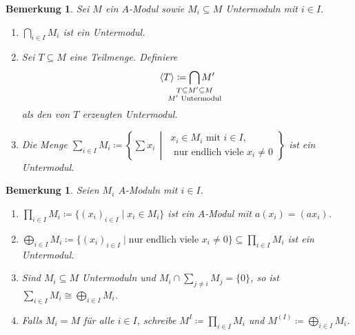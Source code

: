\documentclass[12pt,a4paper]{scrartcl}
\theoremstyle{cplain}
\theoremstyle{cdef}
\newtheorem{beme}[thmcounter]{Bemerkung}
\begin{document}
\begin{beme}
	Sei $M$ ein $A$-Modul sowie $M_i\subseteq M$ Untermoduln mit $i\in I$.
	\begin{enumerate}
		\item $\bigcap\limits_{i\in I} M_i$ ist ein Untermodul.
		\item Sei $T\subseteq M$ eine Teilmenge. Definiere
		\[\<T\> \coloneqq \bigcap_{\mathclap{\substack{T\subseteq M'\subseteq M\\\text{$M'$ Untermodul}}}} M'\] als den von $T$ erzeugten Untermodul.
		\item Die Menge $\sum\limits_{i\in I} M_i  \coloneqq \left\{\sum x_i \,\middle|\, \substack{x_i \in M_i \text{ mit }i\in I,\\\text{ nur endlich viele } x_i\neq 0}\right\}$ ist ein Untermodul.
	\end{enumerate}
\end{beme}
\begin{beme}
	Seien $M_i$ $A$-Moduln mit $i\in I$.
	\begin{enumerate}
		\item $\prod\limits_{i\in I} M_i\coloneqq \{(x_i)_{i\in I}\mid x_i\in M_i\}$ ist ein $A$-Modul mit $a(x_i) = (ax_i)$.
		\item $\bigoplus\limits_{i\in I} M_i\coloneqq \{(x_i)_{i\in I}\mid\text{nur endlich viele }x_i\neq 0\}\subseteq \prod\limits_{i\in I}M_i$ ist ein Untermodul.
        \item Sind $M_i\subseteq M$ Untermoduln und $M_i\cap \sum\limits_{j\neq i} M_j = \{0\}$, so ist $\sum\limits_{i\in I} M_i\cong \bigoplus\limits_{i\in I} M_i$.
        \item Falls $M_i = M$ für alle $i \in I$, schreibe $M^I \coloneqq \prod\limits_{i\in I} M_i$ und $M^{(I)}\coloneqq \bigoplus\limits_{i\in I}M_i$.
	\end{enumerate}
\end{beme}
\end{document}
